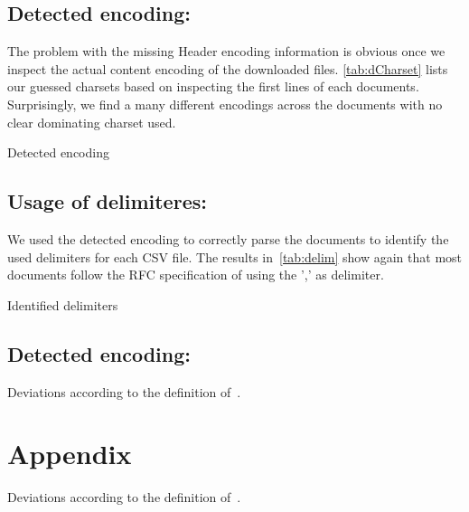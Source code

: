 \documentclass{scrartcl}
\begin{document}
\subsection{Detected encoding:}
The problem with the missing Header encoding information is obvious once we inspect the actual content encoding of the downloaded files.
\autoref{tab:dCharset} lists our guessed charsets based on inspecting the first lines of each documents.  Surprisingly, we find a many different encodings across the documents with no clear dominating charset used. 

\begin{table}[!ht]
\centering

\caption{Detected encoding\label{tab:dCharset}}
\end{table}

\subsection{Usage of delimiteres:}
We used the detected encoding to correctly parse the documents to identify the used delimiters for each CSV file. 
The results in~\autoref{tab:delim} show again that most documents follow the RFC specification of using the ',' as delimiter.
\begin{table}
\centering

\caption{Identified delimiters\label{tab:delim}}
\end{table}

\subsection{Detected encoding:}
\begin{table}[!ht]
\centering

\caption{Deviations according to the definition of~\cite{ermilov:2013aa}\label{tab:deviations}.}
\end{table}



\section*{Appendix}
\begin{table}[!ht]
\centering

\caption{Deviations according to the definition of~\cite{ermilov:2013aa}\label{tab:deviations}.}
\end{table}











\printbibliography 
\end{document}
